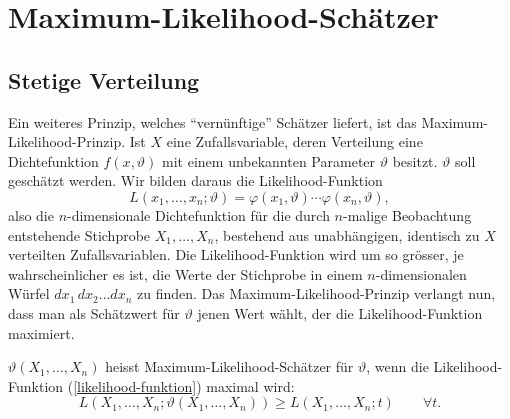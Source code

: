 \section{Maximum-Likelihood-Schätzer} \label{section-maximum-likelihood-schaetzer}
\subsection{Stetige Verteilung}
Ein weiteres Prinzip, welches ``vernünftige'' Schätzer liefert,
ist das Maximum-Likelihood-Prinzip.
Ist $X$ eine Zufallsvariable, deren
Verteilung eine Dichtefunktion $f(x,\vartheta)$ mit einem unbekannten
Parameter $\vartheta$ besitzt. $\vartheta$ soll geschätzt werden.
Wir bilden daraus die Likelihood-Funktion
%
\begin{equation}
L(x_1,\dots,x_n;\vartheta)=\varphi(x_1,\vartheta)\cdots \varphi(x_n,\vartheta),
\label{likelihood-funktion}
\end{equation}
also die $n$-dimensionale Dichtefunktion für die durch $n$-malige 
Beobachtung entstehende Stichprobe $X_1,\dots,X_n$, bestehend aus
unabhängigen, identisch zu $X$ verteilten Zufallsvariablen.
Die Likelihood-Funktion wird um so grösser, je wahrscheinlicher
es ist, die Werte der Stichprobe in einem $n$-dimensionalen Würfel
$dx_1\,dx_2\dots dx_n$ zu finden.
Das Maximum-Likelihood-Prinzip
verlangt nun, dass man als Schätzwert für $\vartheta$ jenen Wert
wählt, der die Likelihood-Funktion maximiert.

\begin{definition}
$\vartheta(X_1,\dots,X_n)$ heisst Maximum-Likelihood-Schätzer für
$\vartheta$, wenn die Likelihood-Funktion (\ref{likelihood-funktion})
maximal wird:
\begin{equation}
L(X_1,\dots,X_n;\vartheta(X_1,\dots,X_n)) \ge L(X_1,\dots,X_n;t)\qquad\forall t.
\end{equation}
\end{definition}

